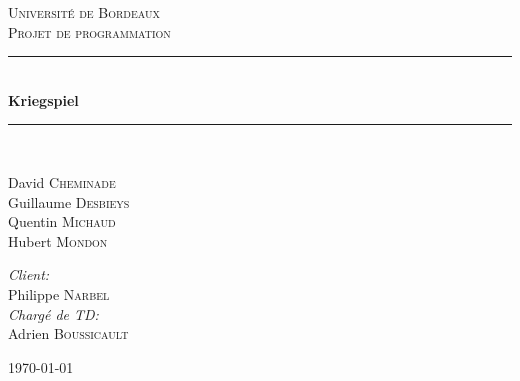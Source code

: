 \newcommand{\HRule}{\rule{\linewidth}{0.5mm}}

\begin{titlepage}
\begin{center}

\textsc{\LARGE Université de Bordeaux}\\[1.5cm]

\textsc{\Large Projet de programmation}\\[0.5cm]


\HRule \\[0.4cm]
{ \huge \bfseries Kriegspiel \\[0.4cm] }

\HRule \\[1.5cm]

\begin{minipage}{0.4\textwidth}
	\begin{flushleft} \large
		David \textsc{Cheminade} \\
		Guillaume \textsc{Desbieys} \\
		Quentin \textsc{Michaud} \\
		Hubert \textsc{Mondon}
	\end{flushleft}
\end{minipage}
\begin{minipage}{0.4\textwidth}
	\begin{flushright} \large
		\emph{Client:} \\
		Philippe \textsc{Narbel}\\
		\emph{Chargé de TD:} \\
		Adrien \textsc{Boussicault}
	\end{flushright}
\end{minipage}

\vfill

{\large \today}

\end{center}
\end{titlepage} 